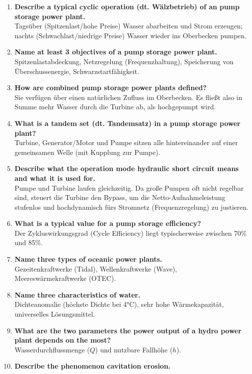 \documentclass{article}
\begin{document}
\begin{enumerate}
    \item \textbf{Describe a typical cyclic operation (dt. Wälzbetrieb) of an pump storage power plant.} \\
    Tagsüber (Spitzenlast/hohe Preise) Wasser abarbeiten und Strom erzeugen; nachts (Schwachlast/niedrige Preise) Wasser wieder ins Oberbecken pumpen.
    \item \textbf{Name at least 3 objectives of a pump storage power plant.} \\
    Spitzenlastabdeckung, Netzregelung (Frequenzhaltung), Speicherung von Überschussenergie, Schwarzstartfähigkeit.
    \item \textbf{How are combined pump storage power plants defined?} \\
    Sie verfügen über einen natürlichen Zufluss im Oberbecken. Es fließt also in Summe mehr Wasser durch die Turbine ab, als hochgepumpt wird.
    \item \textbf{What is a tandem set (dt. Tandemsatz) in a pump storage power plant?} \\
    Turbine, Generator/Motor und Pumpe sitzen alle hintereinander auf einer gemeinsamen Welle (mit Kupplung zur Pumpe).
    \item \textbf{Describe what the operation mode hydraulic short circuit means and what it is used for.} \\
    Pumpe und Turbine laufen gleichzeitig. Da große Pumpen oft nicht regelbar sind, steuert die Turbine den Bypass, um die Netto-Aufnahmeleistung stufenlos und hochdynamisch fürs Stromnetz (Frequenzregelung) zu justieren.
    \item \textbf{What is a typical value for a pump storage efficiency?} \\
    Der Zykluswirkungsgrad (Cycle Efficiency) liegt typischerweise zwischen 70\% und 85\%.
    \item \textbf{Name three types of oceanic power plants.} \\
    Gezeitenkraftwerke (Tidal), Wellenkraftwerke (Wave), Meereswärmekraftwerke (OTEC).
    \item \textbf{Name three characteristics of water.} \\
    Dichteanomalie (höchste Dichte bei 4°C), sehr hohe Wärmekapazität, universelles Lösungsmittel.
    \item \textbf{What are the two parameters the power output of a hydro power plant depends on the most?} \\
    Wasserdurchflussmenge ($Q$) und nutzbare Fallhöhe ($h$).
    \item \textbf{Describe the phenomenon cavitation erosion.} \\

\end{enumerate}
\end{document}
